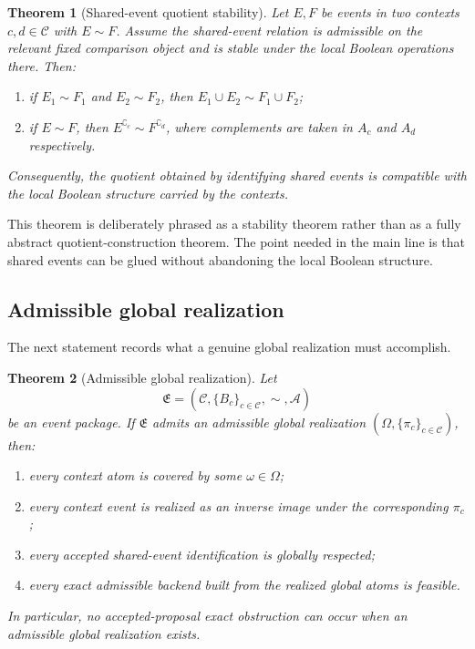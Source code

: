 \documentclass[11pt]{article}
\newcommand{\EventPackage}{\mathfrak{E}}
\newcommand{\CtxFamily}{\mathcal{C}}
\newcommand{\BoolAlg}[1]{B_{#1}}
\newcommand{\SharedEventEq}{\sim}
\newcommand{\AdmissibleFamily}{\mathcal{A}}
\newtheorem{theorem}{Theorem}[section]
\theoremstyle{definition}
\begin{document}
\begin{theorem}[Shared-event quotient stability]\label{thm:shared-event-quotient}
Let \(E,F\) be events in two contexts \(c,d\in\CtxFamily\) with \(E\SharedEventEq F\). Assume the shared-event relation is admissible on the relevant fixed comparison object and is stable under the local Boolean operations there. Then:
\begin{enumerate}
    \item if \(E_1\SharedEventEq F_1\) and \(E_2\SharedEventEq F_2\), then \(E_1\cup E_2 \SharedEventEq F_1\cup F_2\);
    \item if \(E\SharedEventEq F\), then \(E^{\complement_c}\SharedEventEq F^{\complement_d}\), where complements are taken in \(A_c\) and \(A_d\) respectively.
\end{enumerate}
Consequently, the quotient obtained by identifying shared events is compatible with the local Boolean structure carried by the contexts.
\end{theorem}

This theorem is deliberately phrased as a stability theorem rather than as a fully abstract quotient-construction theorem. The point needed in the main line is that shared events can be glued without abandoning the local Boolean structure.

\subsection{Admissible global realization}

The next statement records what a genuine global realization must accomplish.

\begin{theorem}[Admissible global realization]\label{thm:global-packaging}
Let
\[
\EventPackage=(\CtxFamily,\{\BoolAlg{c}\}_{c\in\CtxFamily},\SharedEventEq,\AdmissibleFamily)
\]
be an event package. If \(\EventPackage\) admits an admissible global realization \((\Omega,\{\pi_c\}_{c\in\CtxFamily})\), then:
\begin{enumerate}
    \item every context atom is covered by some \(\omega\in\Omega\);
    \item every context event is realized as an inverse image under the corresponding \(\pi_c\);
    \item every accepted shared-event identification is globally respected;
    \item every exact admissible backend built from the realized global atoms is feasible.
\end{enumerate}
In particular, no accepted-proposal exact obstruction can occur when an admissible global realization exists.
\end{theorem}
\end{document}
